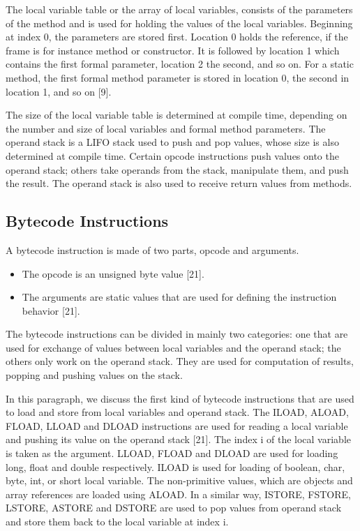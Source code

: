 The local variable table or the array of local variables, consists of the parameters of the method and is used for holding the values of the local variables. Beginning at index 0, the parameters are stored first. Location 0 holds the reference, if the frame is for instance method or constructor. It is followed by location 1 which contains the first formal parameter, location 2 the second, and so on. For a static method, the first formal method parameter is stored in location 0, the second in location 1, and so on [9].

The size of the local variable table is determined at compile time, depending on the number and size of local variables and formal method parameters. The operand stack is a LIFO stack used to push and pop values, whose size is also determined at compile time. Certain opcode instructions push values onto the operand stack; others take operands from the stack, manipulate them, and push the result. The operand stack is also used to receive return values from methods.

\subsection{Bytecode Instructions}
A bytecode instruction is made of two parts, opcode and arguments.
\begin{itemize}
\item The opcode is an unsigned byte value [21]. 
\item The arguments are static values that are used for defining the instruction behavior [21].
\end{itemize}

The bytecode instructions can be divided in mainly two categories: one that are used for exchange of values between local variables and the operand stack; the others only work on the operand stack. They are used for computation of results, popping and pushing values on the stack. 

In this paragraph, we discuss the first kind of bytecode instructions that are used to load and store from local variables and operand stack. The ILOAD, ALOAD, FLOAD, LLOAD and DLOAD instructions are used for reading a local variable and pushing its value on the operand stack [21]. The index i of the local variable is taken as the argument. LLOAD, FLOAD and DLOAD are used for loading long, float and double respectively. ILOAD is used for loading of boolean, char, byte, int, or short local variable. The non-primitive values, which are objects and array references are loaded using ALOAD. In a similar way, ISTORE, FSTORE, LSTORE, ASTORE and DSTORE are used to pop values from operand stack and store them back to the local variable at index i.

